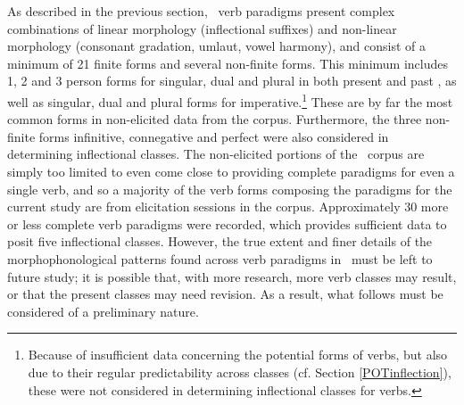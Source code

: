 As described in the previous section, \PS\ verb paradigms present complex combinations of linear morphology (inflectional suffixes) and non-linear morphology (consonant gradation, umlaut, vowel harmony), and consist of a minimum of 21 finite forms and several non-finite forms. This minimum includes 1, 2 and 3 person forms for singular, dual and plural in both present and past , as well as singular, dual and plural forms for imperative.\footnote{Because of insufficient data concerning the potential forms of verbs, but also due to their regular predictability across classes (cf. Section \ref{POTinflection}), these were not considered in determining inflectional classes for verbs.} 
These are by far the most common forms in non-elicited data from the corpus. Furthermore, the three non-finite forms infinitive, connegative and perfect were also considered in determining inflectional classes. %
The non-elicited portions of the \PSDP\ corpus are simply too limited to even come close to providing complete paradigms for even a single verb, and so a majority of the verb forms composing the paradigms for the current study are from elicitation sessions in the corpus. Approximately 30 more or less complete verb paradigms were recorded, which provides sufficient data to posit five inflectional classes. However, the true extent and finer details of the morphophonological patterns found across verb paradigms in \PS\ must be left to future study; it is possible that, with more research, more verb classes may result, or that the present classes may need revision. As a result, what follows must be considered of a preliminary nature. 


